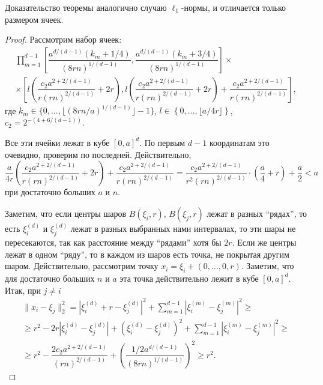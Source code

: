 \documentclass[12pt]{article}
\theoremstyle{plain}
\theoremstyle{definition}
\theoremstyle{remark}
\def\geq{\geqslant}
\begin{document}
Доказательство теоремы аналогично случаю $\ell_1$-нормы, и отличается только размером ячеек.
\begin{proof}
    Рассмотрим набор ячеек: 
    \begin{multline*}
        \prod\limits_{m=1}^{d-1}\left[\dfrac{a^{d/(d-1)}(k_m+1/4)}{(8rn)^{1/(d-1)}}, \dfrac{a^{d/(d-1)}(k_m+3/4)}{(8rn)^{1/(d-1)}}\right]
    \times \\
    \times \left[l\left(\dfrac{c_2a^{2 + 2/(d-1)}}{r(rn)^{2/(d-1)}} +2r\right) ,  l\left(\dfrac{c_2a^{2 + 2/(d-1)}}{r(rn)^{2/(d-1)}}+2r\right) + \dfrac{c_2a^{2 +2/(d-1)}}{r(rn)^{2/(d-1)}}  \right],
    \end{multline*}{}
    где $k_m \in \{0, \ldots, \lfloor (8rn/a)^{1/(d-1)}\rfloor-1\}$, $l\in \left\{0, \ldots, \lfloor a/4r\rfloor\right\}$, $c_2 = 2^{-(4+6/(d-1))}$. 
    
    Все эти ячейки лежат в кубе $[0,a]^d$. По первым $d-1$ координатам это очевидно, проверим по последней. Действительно, 
    \begin{equation*}
        \dfrac{a}{4r}\left(\dfrac{c_2a^{2 + 2/(d-1)}}{r(rn)^{2/(d-1)}}+2r\right) + \dfrac{c_2a^{2 +2/(d-1)}}{r(rn)^{2/(d-1)}} 
        =\dfrac{c_2a^{2+ 2/(d-1)}}{r^2(rn)^{2/(d-1)}}\cdot\left(\dfrac{a}{4} + r\right) + \dfrac{a}{2} 
        < a
    \end{equation*}{}
    при достаточно больших $a$ и $n$.
    
    Заметим, что если центры шаров $B(\xi_i, r)$, $B(\xi_j, r)$ лежат в разных ``рядах'', то есть $\xi_i^{(d)}$ и $\xi_j^{(d)}$ лежат в разных выбранных нами интервалах, то эти шары не пересекаются, так как расстояние между ``рядами'' хотя бы $2r$. Если же центры лежат в одном ``ряду'', то в каждом из шаров есть точка, не покрытая другим шаром. Действительно, рассмотрим точку  $x_i = \xi_i + (0, \ldots, 0, r)$. Заметим, что для достаточно больших $n$ и $a$ эта точка действительно лежит в кубе $[0, a]^d$. Итак, при $j \not= i$
        \begin{multline*}
        \|x_i - \xi_j\|^2_2 = 
        |\xi_i^{(d)} + r - \xi_j^{(d)} |^2 + \sum_{m=1}^{d-1}|\xi_i^{(m)} - \xi_j^{(m)}|^2 \geq\\
        \geq r^2 - 2r|\xi_i^{(d)} - \xi_j^{(d)}| + (\xi_i^{(d)} - \xi_j^{(d)})^2  + \sum_{m=1}^{d-1}|\xi_i^{(m)} - \xi_j^{(m)}|^2 \geq \\
        \geq r^2 - \dfrac{2c_2a^{2+2/(d-1)}}{(rn)^{2/(d-1)}} + \left(\dfrac{1/2a^{d/(d-1)}}{(8rn)^{1/(d-1)}}\right)^2 \geq r^2.
    \end{multline*}{}
    

\end{proof}
\end{document}
